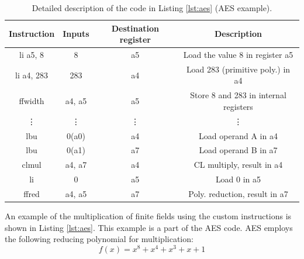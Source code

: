 \begin{table}[tp]
    \begin{tabular}{
    >{\columncolor[HTML]{EFEFEF}}c ccc}
    \cellcolor[HTML]{C0C0C0}Instruction          & \cellcolor[HTML]{C0C0C0}Inputs & \cellcolor[HTML]{C0C0C0}Destination register & \cellcolor[HTML]{C0C0C0}Description   \\ \hline
    li a5, 8                                     & 8                              & a5                                           & Load the value 8 in register a5       \\
    li a4, 283                                   & 283                            & a4                                           & Load 283 (primitive poly.) in a4      \\
    ffwidth                                      & a4, a5                         & a5                                           & Store 8 and 283 in internal registers \\
    \vdots & \vdots           & \vdots                         & \vdots                  \\
    lbu                                          & 0(a0)                          & a4                                           & Load operand A in a4                  \\
    lbu                                          & 0(a1)                          & a7                                           & Load operand B in a7                  \\
    clmul                                        & a4, a7                         & a4                                           & CL multiply, result in a4             \\
    li                                           & 0                              & a5                                           & Load 0 in a5                          \\
    ffred                                        & a4, a5                         & a7                                           & Poly. reduction, result in a7        
    \end{tabular}
    \caption{Detailed description of the code in Listing \ref{lst:aes} (AES example).}
    \label{tab:detail}
\end{table}

An example of the multiplication of finite fields using the custom instructions is shown in Listing \ref{lst:aes}. 
This example is a part of the AES code. AES employs the following reducing polynomial for multiplication:
\begin{equation}
    f(x) = x^{8} + x^{4} + x^{3} + x + 1
    \label{eq:aes}
\end{equation}


